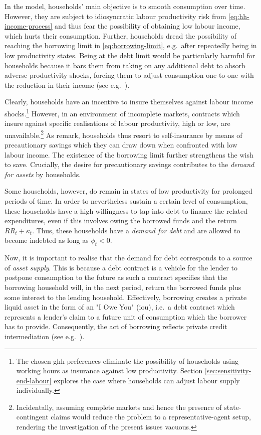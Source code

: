 \documentclass[12pt]{article} %
\numberwithin{equation}{section} %
\numberwithin{figure}{section}
\numberwithin{table}{section}
\begin{document}
In the model, households' main objective is to smooth consumption over time. However, they are subject to idiosyncratic labour productivity risk from \eqref{eq:hh-income-process} and thus fear the possibility of obtaining low labour income, which hurts their consumption. Further, households dread the possibility of reaching the borrowing limit in \eqref{eq:borrowing-limit}, e.g.~after repeatedly being in low productivity states. Being at the debt limit would be particularly harmful for households because it bars them from taking on any additional debt to absorb adverse productivity shocks, forcing them to adjust consumption one-to-one with the reduction in their income (see e.g.~\cite{carroll2021}). 

Clearly, households have an incentive to insure themselves against labour income shocks.\footnote{The chosen \Gls{ghh} preferences eliminate the possibility of households using working hours as insurance against low productivity. Section \ref{sec:sensitivity-end-labour} explores the case where households can adjust labour supply individually.} However, in an environment of incomplete markets, contracts which insure against specific realisations of labour productivity, high or low, are unavailable.\footnote{Incidentally, assuming complete markets and hence the presence of state-contingent claims would reduce the problem to a representative-agent setup, rendering the investigation of the present issues vacuous.} As \textcite{heath2009} remark, households thus resort to self-insurance by means of precautionary savings which they can draw down when confronted with low labour income. The existence of the borrowing limit further strengthens the wish to save. Crucially, the desire for precautionary savings contributes to the \textit{demand for assets} by households. %

Some households, however, do remain in states of low productivity for prolonged periods of time. In order to nevertheless sustain a certain level of consumption, these households have a high willingness to tap into debt to finance the related expenditures, even if this involves owing the borrowed funds and the return $RR_t + \kappa_t$. Thus, these households have a \textit{demand for debt} and are allowed to become indebted as long as $\phi_t < 0$.

Now, it is important to realise that the demand for debt corresponds to a source of \textit{asset supply}. This is because a debt contract is a vehicle for the lender to postpone consumption to the future as such a contract specifies that the borrowing household will, in the next period, return the borrowed funds plus some interest to the lending household. Effectively, borrowing creates a private liquid asset in the form of an "I Owe You" (\Gls{iou}), i.e.~a debt contract which represents a lender's claim to a future unit of consumption which the borrower has to provide. Consequently, the act of borrowing reflects private credit intermediation (see e.g.~\cite{bayer2023}).
\end{document}
